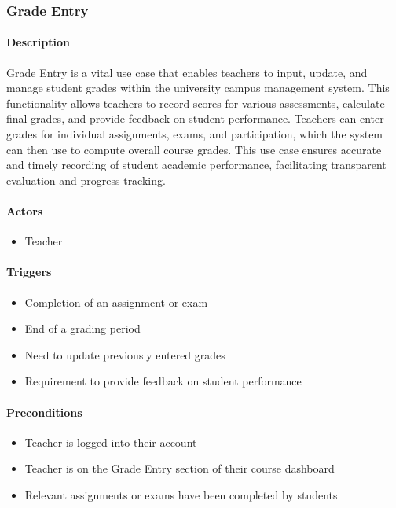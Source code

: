 \subsubsection{Grade Entry}

\paragraph{Description}
Grade Entry is a vital use case that enables teachers to input, update, and manage student grades within the university campus management system. This functionality allows teachers to record scores for various assessments, calculate final grades, and provide feedback on student performance. Teachers can enter grades for individual assignments, exams, and participation, which the system can then use to compute overall course grades. This use case ensures accurate and timely recording of student academic performance, facilitating transparent evaluation and progress tracking.

\paragraph{Actors}
\begin{itemize}
    \item Teacher
\end{itemize}

\paragraph{Triggers}
\begin{itemize}
    \item Completion of an assignment or exam
    \item End of a grading period
    \item Need to update previously entered grades
    \item Requirement to provide feedback on student performance
\end{itemize}

\paragraph{Preconditions}
\begin{itemize}
    \item Teacher is logged into their account
    \item Teacher is on the Grade Entry section of their course dashboard
    \item Relevant assignments or exams have been completed by students
\end{itemize}

